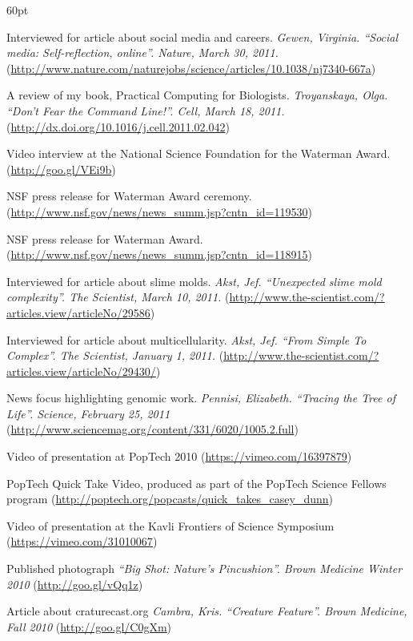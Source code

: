 \begin{entry}{60pt}
\item [\rm 2011] Interviewed for article about social media and careers. \emph{Gewen, Virginia. ``Social media: Self-reflection, online''. Nature, March 30, 2011.} (\url{http://www.nature.com/naturejobs/science/articles/10.1038/nj7340-667a})
\item [\rm 2011] A review of my book, Practical Computing for Biologists. \emph{Troyanskaya, Olga. ``Don't Fear the Command Line!''. Cell, March 18, 2011.} (\url{http://dx.doi.org/10.1016/j.cell.2011.02.042})
\item [\rm 2011] Video interview at the National Science Foundation for the Waterman Award. (\url{http://goo.gl/VEi9b})
\item [\rm 2011] NSF press release for Waterman Award ceremony. (\url{http://www.nsf.gov/news/news_summ.jsp?cntn_id=119530})
\item [\rm 2011] NSF press release for Waterman Award. (\url{http://www.nsf.gov/news/news_summ.jsp?cntn_id=118915})
\item [\rm 2011] Interviewed for article about slime molds. \emph{Akst, Jef. ``Unexpected slime mold complexity''. The Scientist, March 10, 2011.} (\url{http://www.the-scientist.com/?articles.view/articleNo/29586})
\item [\rm 2011] Interviewed for article about multicellularity. \emph{Akst, Jef. ``From Simple To Complex''. The Scientist, January 1, 2011.} (\url{http://www.the-scientist.com/?articles.view/articleNo/29430/})
\item [\rm 2011] News focus highlighting genomic work. \emph{Pennisi, Elizabeth. ``Tracing the Tree of Life''. Science, February 25, 2011} (\url{http://www.sciencemag.org/content/331/6020/1005.2.full})
\item [\rm 2010] Video of presentation at PopTech 2010 (\url{https://vimeo.com/16397879})
\item [\rm 2010] PopTech Quick Take Video, produced as part of the PopTech Science Fellows program (\url{http://poptech.org/popcasts/quick\_takes\_casey\_dunn})
\item [\rm 2010] Video of presentation at the Kavli Frontiers of Science Symposium (\url{https://vimeo.com/31010067})
\item [\rm 2010] Published photograph \emph{``Big Shot: Nature's Pincushion''. Brown Medicine Winter 2010} (\url{http://goo.gl/vQq1z})
\item [\rm 2010] Article about craturecast.org \emph{Cambra, Kris. ``Creature Feature''. Brown Medicine, Fall 2010} (\url{http://goo.gl/C0gXm})

\end{entry}
